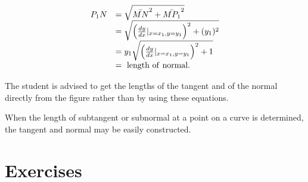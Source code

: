 \begin{equation}
\begin{array}{ll}
P_1N 
&= \sqrt{\bar{MN}^2 + \bar{MP_1}^2}\\
&= \sqrt{ \left ( \frac{dy}{dx}|_{x=x_1,y=y_1} \right)^2 + (y_1)^2}\\
&= y_1 \sqrt{ \left ( \frac{dy}{dx}|_{x=x_1,y=y_1} \right)^2 + 1}\\
 &=
\ {\rm length\ of\ normal}.
\end{array}
\label{eqn:6-65}
\end{equation}

The student is advised to get the lengths of the tangent 
and of the normal directly from the figure rather than by using %
these equations.

When the length of subtangent or subnormal at a point on 
a curve is determined, the tangent and normal may be easily constructed.

\section{Exercises}

